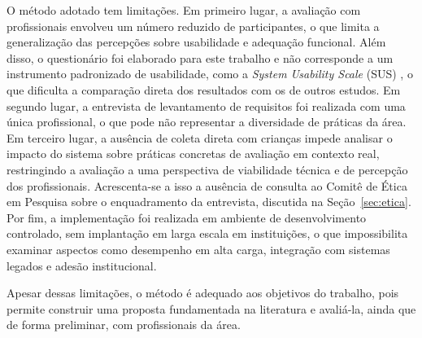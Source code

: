 O método adotado tem limitações. Em primeiro lugar, a avaliação com profissionais envolveu um número reduzido de participantes, o que limita a generalização das percepções sobre usabilidade e adequação funcional. Além disso, o questionário foi elaborado para este trabalho e não corresponde a um instrumento padronizado de usabilidade, como a \textit{System Usability Scale} (SUS) \cite{brooke1996_sus}, o que dificulta a comparação direta dos resultados com os de outros estudos. Em segundo lugar, a entrevista de levantamento de requisitos foi realizada com uma única profissional, o que pode não representar a diversidade de práticas da área. Em terceiro lugar, a ausência de coleta direta com crianças impede analisar o impacto do sistema sobre práticas concretas de avaliação em contexto real, restringindo a avaliação a uma perspectiva de viabilidade técnica e de percepção dos profissionais. Acrescenta-se a isso a ausência de consulta ao Comitê de Ética em Pesquisa sobre o enquadramento da entrevista, discutida na Seção~\ref{sec:etica}. Por fim, a implementação foi realizada em ambiente de desenvolvimento controlado, sem implantação em larga escala em instituições, o que impossibilita examinar aspectos como desempenho em alta carga, integração com sistemas legados e adesão institucional.

Apesar dessas limitações, o método é adequado aos objetivos do trabalho, pois permite construir uma proposta fundamentada na literatura e avaliá-la, ainda que de forma preliminar, com profissionais da área.